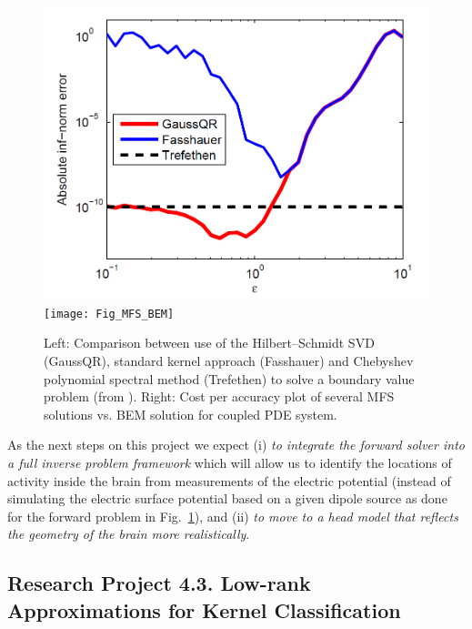 \documentclass[11pt]{NSFamsart}
\begin{document}
\begin{figure}[h]
    \centering
    \includegraphics[width=.35\linewidth]{HSSVD_BVP}
    \texttt{[image: Fig\_MFS\_BEM]}
\caption{Left: Comparison between use of the Hilbert--Schmidt SVD (GaussQR), standard kernel approach (Fasshauer) and Chebyshev polynomial spectral method (Trefethen) to solve a boundary value problem (from \citep{McCourt13}). Right: Cost per accuracy plot of several MFS solutions vs. BEM solution for coupled PDE system.}\label{Fig_MFS_BEM}
\end{figure}

As the next steps on this project we expect (i) \emph{to integrate the forward solver into a full inverse problem framework} which will allow us to identify the locations of activity inside the brain from measurements of the electric potential (instead of simulating the electric surface potential based on a given dipole source as done for the forward problem in Fig.~\ref{Fig_MFS_BEM}), and (ii) \emph{to move to a head model that reflects the geometry of the brain more realistically}.

\subsection{Research Project 4.3. Low-rank Approximations for Kernel Classification}\label{Sec_TruncHS} 
\end{document}
